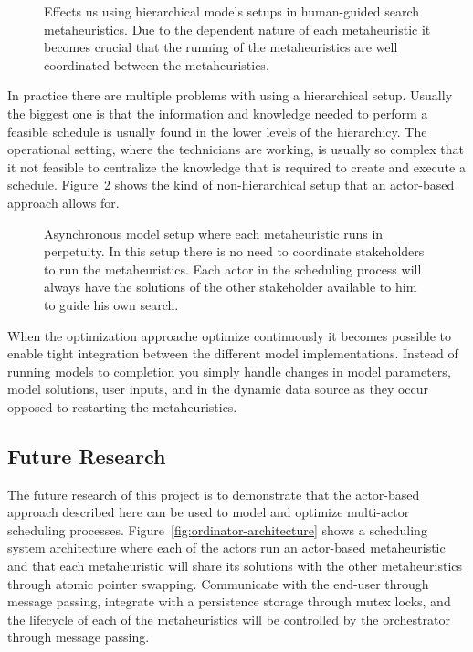 \begin{figure}[H]
	
	\label{fig:discussion:hierarchical_model_setup}
	\caption{Effects us using hierarchical models setups in human-guided search metaheuristics.
	Due to the dependent nature of each metaheuristic it becomes crucial that the running of 
	the metaheuristics are well coordinated between the metaheuristics.}
\end{figure}

In practice there are multiple problems with using a hierarchical setup.
Usually the biggest one is that the information and knowledge needed to 
perform a feasible schedule is usually found in the lower levels of the 
hierarchicy. The operational setting, where the
technicians are working, is usually so complex that it not feasible to 
centralize the knowledge that is required to create and execute a 
schedule. Figure~\ref{fig:discussion:asynchronous_setup}
shows the kind of non-hierarchical setup that an actor-based approach 
allows for.

\begin{figure}[H]
	
	\caption{Asynchronous model setup where each metaheuristic runs in perpetuity. In this setup
	there is no need to coordinate stakeholders to run the metaheuristics. Each actor in the 
	scheduling process will always have the solutions of the other stakeholder available to 
	him to guide his own search.}
	\label{fig:discussion:asynchronous_setup}
\end{figure}

When the optimization approache optimize continuously it becomes possible
to enable tight integration between the different model implementations. 
Instead of running models to completion you simply handle changes in model 
parameters, model solutions, user inputs, and in the dynamic data source as 
they occur opposed to restarting the metaheuristics.

\subsection{Future Research}
\label{sec:discussion:future_research}
The future research of this project is to demonstrate that
the actor-based approach described here can be used to model and optimize 
multi-actor scheduling processes. 
Figure~\ref{fig:ordinator-architecture}
shows a scheduling system architecture where each of the actors run an actor-based metaheuristic
and that each metaheuristic will share its solutions with the other
metaheuristics through atomic pointer swapping. Communicate with the end-user
through message passing, integrate with a persistence storage through mutex
locks, and the lifecycle of each of the metaheuristics will be controlled by
the orchestrator through message passing. 

